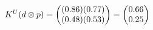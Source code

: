 \documentclass[preview]{standalone}
\begin{document}
\begin{align*}
\special{dvisvgm:raw <g id='unique000'>}K^U(d \otimes p) = \begin{pmatrix} (0.86)(0.77) \\ (0.48)(0.53) \end{pmatrix} = \begin{pmatrix} 0.66 \\ 0.25 \end{pmatrix}\special{dvisvgm:raw </g>}
\end{align*}
\end{document}
